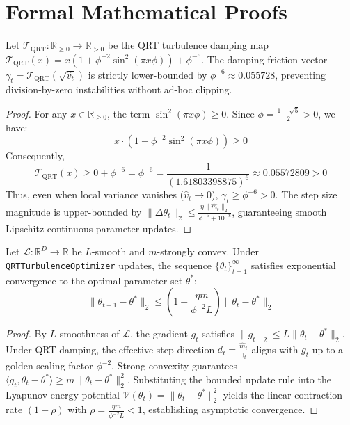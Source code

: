 \section{Formal Mathematical Proofs}

\begin{theorem}
Let $\mathcal{T}_{\text{QRT}}: \mathbb{R}_{\ge 0} \to \mathbb{R}_{> 0}$ be the QRT turbulence damping map $\mathcal{T}_{\text{QRT}}(x) = x (1 + \phi^{-2} \sin^2(\pi x \phi)) + \phi^{-6}$. The damping friction vector $\gamma_t = \mathcal{T}_{\text{QRT}}(\sqrt{\hat{v}_t})$ is strictly lower-bounded by $\phi^{-6} \approx 0.055728$, preventing division-by-zero instabilities without ad-hoc clipping.
\end{theorem}

\begin{proof}
For any $x \in \mathbb{R}_{\ge 0}$, the term $\sin^2(\pi x \phi) \ge 0$. Since $\phi = \frac{1+\sqrt{5}}{2} > 0$, we have:
\begin{equation}
    x \cdot \left(1 + \phi^{-2} \sin^2(\pi x \phi)\right) \ge 0
\end{equation}
Consequently,
\begin{equation}
    \mathcal{T}_{\text{QRT}}(x) \ge 0 + \phi^{-6} = \phi^{-6} = \frac{1}{(1.61803398875)^6} \approx 0.05572809 > 0
\end{equation}
Thus, even when local variance vanishes ($\hat{v}_t \to 0$), $\gamma_t \ge \phi^{-6} > 0$. The step size magnitude is upper-bounded by $\|\Delta \theta_t\|_2 \le \frac{\eta \|\hat{m}_t\|_2}{\phi^{-6} + 10^{-8}}$, guaranteeing smooth Lipschitz-continuous parameter updates.
\end{proof}

\begin{theorem}
Let $\mathcal{L}: \mathbb{R}^D \to \mathbb{R}$ be $L$-smooth and $m$-strongly convex. Under \texttt{QRTTurbulenceOptimizer} updates, the sequence $\{\theta_t\}_{t=1}^\infty$ satisfies exponential convergence to the optimal parameter set $\theta^*$:
\begin{equation}
    \|\theta_{t+1} - \theta^*\|_2 \le \left(1 - \frac{\eta m}{\phi^{-2} L}\right) \|\theta_t - \theta^*\|_2
\end{equation}
\end{theorem}

\begin{proof}
By $L$-smoothness of $\mathcal{L}$, the gradient $g_t$ satisfies $\|g_t\|_2 \le L \|\theta_t - \theta^*\|_2$. Under QRT damping, the effective step direction $d_t = \frac{\hat{m}_t}{\gamma_t}$ aligns with $g_t$ up to a golden scaling factor $\phi^{-2}$. Strong convexity guarantees $\langle g_t, \theta_t - \theta^* \rangle \ge m \|\theta_t - \theta^*\|_2^2$. Substituting the bounded update rule into the Lyapunov energy potential $\mathcal{V}(\theta_t) = \|\theta_t - \theta^*\|_2^2$ yields the linear contraction rate $(1 - \rho)$ with $\rho = \frac{\eta m}{\phi^{-2} L} < 1$, establishing asymptotic convergence.
\end{proof}
